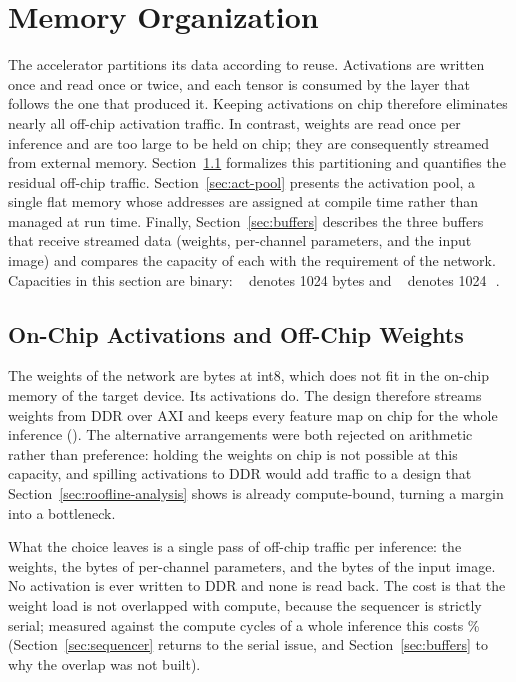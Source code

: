 \section{Memory Organization}
\label{sec:memory}

The accelerator partitions its data according to reuse. Activations are
written once and read once or twice, and each tensor is consumed by the
layer that follows the one that produced it. Keeping activations on chip
therefore eliminates nearly all off-chip activation traffic. In contrast,
weights are read once per inference and are too large to be held on chip;
they are consequently streamed from external memory.
Section~\ref{sec:mem-split} formalizes this partitioning and quantifies the
residual off-chip traffic. Section~\ref{sec:act-pool} presents the
activation pool, a single flat memory whose addresses are assigned at
compile time rather than managed at run time. Finally,
Section~\ref{sec:buffers} describes the three buffers that receive streamed
data (weights, per-channel parameters, and the input image) and compares the
capacity of each with the requirement of the network.
Capacities in this section are binary: \si{\kibi\byte} denotes 1024 bytes
and \si{\mebi\byte} denotes 1024\,\si{\kibi\byte}.

\subsection{On-Chip Activations and Off-Chip Weights}
\label{sec:mem-split}

The weights of the network are \thWeightBytes{} bytes at int8, which does not
fit in the on-chip memory of the target device. Its activations do. The design therefore streams weights
from DDR over AXI and keeps every feature map on chip for the whole inference
(). The alternative arrangements were both rejected on arithmetic
rather than preference: holding the weights on chip is not possible at this
capacity, and spilling activations to DDR would add traffic to a design that
Section~\ref{sec:roofline-analysis} shows is already compute-bound, turning a
margin into a bottleneck.

What the choice leaves is a single pass of off-chip traffic per inference:
the weights, the \thParamBlobBytes{} bytes of per-channel parameters, and the
\thImgBytes{} bytes of the input image. No activation is ever written to DDR
and none is read back. The cost is that the weight load is not overlapped with
compute, because the sequencer is strictly serial; measured against the
compute cycles of a whole inference this costs \thLoadOverheadPct\%
(Section~\ref{sec:sequencer} returns to the serial issue, and
Section~\ref{sec:buffers} to why the overlap was not built).

